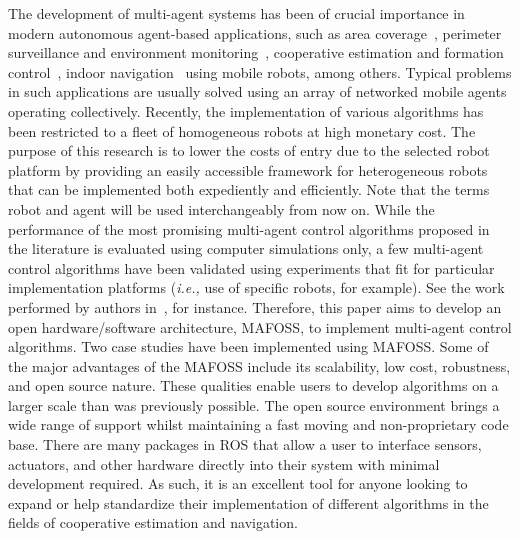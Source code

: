 The development of multi-agent systems has been of crucial importance in modern autonomous agent-based applications, such as area coverage~\cite{Cortes2004,Lekien2009,MiNgBoSp2014-j1}, perimeter surveillance and environment monitoring~\cite{Pimenta2013,Zhang2013,Rossi2016},  cooperative estimation and formation control~\cite{Spinello2014,Marshall2004,Ge2017,Li2017}, indoor navigation~\cite{GuMi2008-j1,KnHeMi2017-c1} using mobile robots, among others. Typical problems in such applications are usually solved using an array of networked mobile agents operating collectively. Recently, the implementation of various algorithms has been restricted to a fleet of homogeneous robots at high monetary cost. The purpose of this research is to lower the costs of entry due to the selected robot platform by providing an easily accessible framework for heterogeneous robots that can be implemented both expediently and efficiently. Note that the terms robot and agent will be used interchangeably from now on.  While the performance of the most promising multi-agent control algorithms proposed in the literature is evaluated using computer simulations only, a few multi-agent control algorithms have been validated using experiments that fit for particular implementation platforms (\textit{i.e.,} use of specific robots, for example). See the work performed by authors in~\cite{Marshall2004,MiKn2018-j1,MiKnHe2018-j1}, for instance. Therefore, this paper aims to develop an open hardware/software architecture, MAFOSS, to implement multi-agent control algorithms. Two case studies have been implemented using MAFOSS. Some of the major advantages of the MAFOSS include its scalability, low cost, robustness, and open source nature. These qualities enable users to develop algorithms on a larger scale than was previously possible. 
%
The open source environment brings a wide range of support whilst maintaining a fast moving and non-proprietary code base. There are many packages in ROS that allow a user to interface sensors, actuators, and other hardware directly into their system with minimal development required. As such, it is an excellent tool for anyone looking to expand or help standardize their implementation of different algorithms in the fields of cooperative estimation and navigation. 



